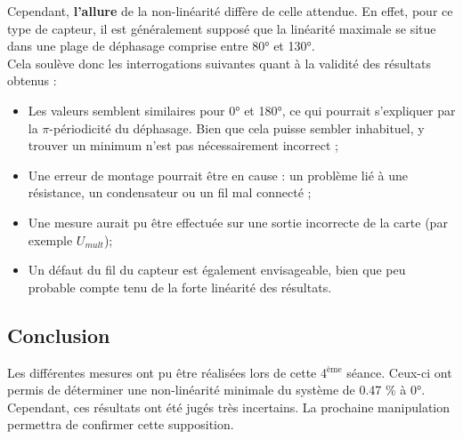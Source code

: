     Cependant, \textbf{l'allure} de la non-linéarité diffère de celle attendue. En effet, pour ce type de 
    capteur, il est généralement supposé que la linéarité maximale se situe dans une plage de 
    déphasage comprise entre 80° et 130°.\\ 

    Cela soulève donc les interrogations suivantes quant à la validité des résultats obtenus : 

    \begin{itemize} \item Les valeurs semblent similaires pour 0° et 180°, ce qui pourrait
         s'expliquer par la $\pi$-périodicité du déphasage. Bien que cela puisse sembler inhabituel, 
         y trouver un minimum n'est pas nécessairement incorrect ;
         \item Une erreur de montage pourrait être en cause : un problème lié à une résistance, 
         un condensateur ou un fil mal connecté ; 
         \item Une mesure aurait pu être effectuée sur une sortie incorrecte de la carte (par exemple $U_{mult}$); 
         \item Un défaut du fil du capteur est également envisageable, bien que peu probable compte 
         tenu de la forte linéarité des résultats. 
        \end{itemize}

        \subsection{Conclusion}

        Les différentes mesures ont pu être réalisées lors de cette 4$^{\text{ème}}$ séance. Ceux-ci ont
        permis de déterminer une non-linéarité minimale du système de 0.47 \% à 0°. Cependant,
        ces résultats ont été jugés très incertains. La prochaine manipulation permettra de 
        confirmer cette supposition.  